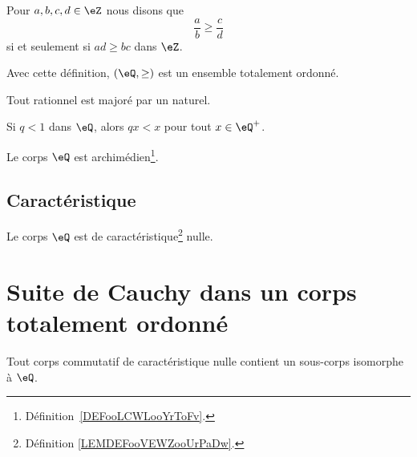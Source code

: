 \begin{propositionDef}      \label{DEFooZEXXooUtOhqB}
	Pour \( a,b,c,d\in \eZ\) nous disons que
	\begin{equation}
		\frac{ a }{ b }\geq \frac{ c }{ d }
	\end{equation}
	si et seulement si \( ad\geq bc\) dans \( \eZ\).

	Avec cette définition, \( (\eQ,\geq)\) est un ensemble totalement ordonné.
\end{propositionDef}

\begin{lemma} \label{LEMooEBTIooGMoHsj}
	Tout rationnel est majoré par un naturel.
\end{lemma}


\begin{proposition}     \label{PROPooBTCCooVVvaeL}
	Si \( q<1\) dans \( \eQ\), alors \( qx<x\) pour tout \( x\in \eQ^+\).
\end{proposition}

\begin{proposition}     \label{PROPooMXGPooDUkOuv}
	Le corps \( \eQ\) est archimédien\footnote{Définition~\ref{DEFooLCWLooYrToFv}.}.
\end{proposition}

\subsection{Caractéristique}

\begin{lemma}       \label{LEMooYCPUooNxEPhB}
	Le corps \( \eQ\) est de caractéristique\footnote{Définition \ref{LEMDEFooVEWZooUrPaDw}.} nulle.
\end{lemma}

\section{Suite de Cauchy dans un corps totalement ordonné}


\begin{lemma}        \label{LEMooLTBIooSZnvsQ}
	Tout corps commutatif de caractéristique nulle contient un sous-corps isomorphe à \( \eQ\).
\end{lemma}

